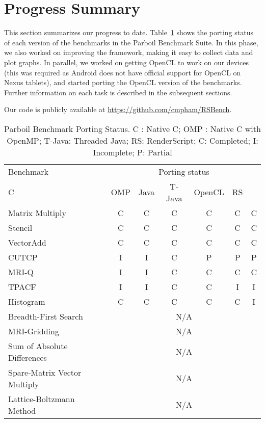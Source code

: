 \section*{Progress Summary}

This section summarizes our progress to date. Table~\ref{table:parboil} shows the
porting status of each version of the benchmarks in the Parboil Benchmark Suite.
In this phase, we also worked on improving the framework, making it easy to collect
data and plot graphs. In parallel, we worked on getting OpenCL to work on our
devices (this was required as Android does not have official support for OpenCL
on Nexus tablets), and started porting the OpenCL version of the benchmarks. 
Further information on each task is described in the subsequent sections.

Our code is publicly available at \url{https://github.com/cmpham/RSBench}.

\begin{table}[h]\small
\centering
\begin{tabular}{ | l | c | c | c | c | c | c |}
    \hline 
    Benchmark & \multicolumn{6}{|c|}{Porting status} \\ \cline{2-5}
             C & OMP & Java & T-Java & OpenCL & RS \\ \hline
    Matrix Multiply & C & C & C & C & C & C \\ \hline
    Stencil & C & C & C & C & C & C \\ \hline
    VectorAdd & C & C & C & C & C & C \\ \hline
    CUTCP & I & I & C & P  & P  & P \\ \hline
    MRI-Q & I & I & C & C & C & C \\ \hline
    TPACF & I & I & C & C & I & I \\ \hline
    Histogram & C & C & C & C & C & I \\ \hline
    Breadth-First Search & \multicolumn{6}{|c|}{N/A} \\ \hline
    MRI-Gridding & \multicolumn{6}{|c|}{N/A} \\ \hline
    Sum of Absolute Differences & \multicolumn{6}{|c|}{N/A} \\ \hline
    Spare-Matrix Vector Multiply & \multicolumn{6}{|c|}{N/A} \\ \hline
    Lattice-Boltzmann Method & \multicolumn{6}{|c|}{N/A} \\ \hline
    \hline
\end{tabular}
\caption{Parboil Benchmark Porting Status. C : Native C; OMP : Native C with OpenMP; T-Java: Threaded Java; RS:
RenderScript; C: Completed; I: Incomplete; P: Partial}
\label{table:parboil}
\end{table}

